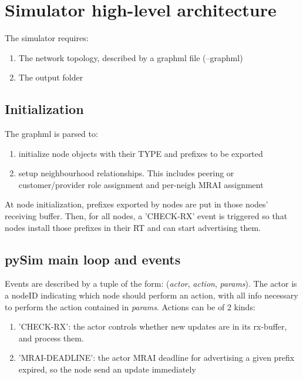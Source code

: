 \documentclass[fleqn,10pt]{SelfArx} %
\begin{document}
\flushbottom %
\maketitle %
\thispagestyle{empty} %

\section{Simulator high-level architecture} 
The simulator requires:
\begin{enumerate}[noitemsep]
  \item The network topology, described by a graphml file (\textsf{--graphml})
  \item The output folder
\end{enumerate}

\subsection*{Initialization}
The graphml is parsed to:
\begin{enumerate}[noitemsep]
  \item initialize node objects with their TYPE and prefixes to be exported
  \item setup neighbourhood relationships. This includes peering or customer/provider role assignment and per-neigh MRAI assignment
\end{enumerate}
At node initialization, prefixes exported by nodes are put in those nodes' receiving buffer. Then, for all nodes, a 'CHECK-RX' event is triggered so that nodes install those prefixes in their RT and can start advertising them. 

\subsection*{pySim main loop and events}
Events are described by a tuple of the form: (\textit{actor}, \textit{action}, \textit{params}). The actor is a nodeID indicating which node should perform an action, with all info necessary to perform the action contained in \textit{params}. Actions can be of 2 kinds:

\begin{enumerate}[noitemsep]
 \item 'CHECK-RX': the actor controls whether new updates are in its rx-buffer, and process them.
 \item 'MRAI-DEADLINE': the actor MRAI deadline for advertising a given prefix expired, so the node send an update immediately
\end{enumerate}
\end{document}
